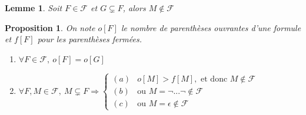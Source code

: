 \documentclass[]{article}
\newtheorem{myproposition}{Proposition}
\newtheorem{mylemma}{Lemme}
\theoremstyle{remark}
\theoremstyle{definition}
\begin{document}
\begin{mylemma}
	Soit $F \in \mathcal{F}$ et $G \subsetneq F$, alors $M \notin \mathcal{F}$
\end{mylemma}

\begin{myproposition}
	On note $o[F]$ le nombre de parenthèses ouvrantes d'une formule et $f[F]$ pour les parenthèses fermées.
	\begin{enumerate}
			\item $\forall F \in \mathcal{F}, ~ o[F]=o[G]$
			\item $\forall F, M \in \mathcal{F}, ~ M \subsetneq F \Longrightarrow
			\left\{
			\begin{array}{ll}
				(a) & o[M] > f[M], \text{ et donc } M \notin \mathcal{F} \\
				(b) & \text{ou } M = \neg ... \neg \notin \mathcal{F} \\
				(c) & \text{ou } M = \epsilon \notin \mathcal{F}
			\end{array}
			\right.$
	\end{enumerate}
\end{myproposition}
\end{document}

